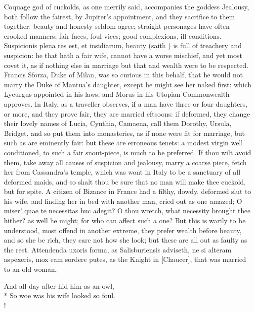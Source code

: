 Coquage god of cuckolds, as one merrily said, accompanies the
goddess Jealousy, both follow the fairest, by Jupiter's appointment,
and they sacrifice to them together: beauty and honesty seldom agree;
straight personages have often crooked manners; fair faces, foul vices;
good complexions, ill conditions. Suspicionis plena res est, et
insidiarum, beauty (saith \Chrysostom{}) is full of treachery and
suspicion: he that hath a fair wife, cannot have a worse mischief, and
yet most covet it, as if nothing else in marriage but that and wealth
were to be respected. Francis Sforza, Duke of Milan, was so
curious in this behalf, that he would not marry the Duke of Mantua's
daughter, except he might see her naked first: which Lycurgus appointed
in his laws, and Morus in his Utopian Commonwealth approves. In
Italy, as a traveller observes, if a man have three or four daughters,
or more, and they prove fair, they are married eftsoons: if deformed,
they change their lovely names of Lucia, Cynthia, Camaena, call them
Dorothy, Ursula, Bridget, and so put them into monasteries, as if none
were fit for marriage, but such as are eminently fair: but these are
erroneous tenets: a modest virgin well conditioned, to such a fair
snout-piece, is much to be preferred. If thou wilt avoid them, take
away all causes of suspicion and jealousy, marry a coarse piece, fetch
her from Cassandra's temple, which was wont in Italy to be a
sanctuary of all deformed maids, and so shalt thou be sure that no man
will make thee cuckold, but for spite. A citizen of Bizance in France
had a filthy, dowdy, deformed slut to his wife, and finding her in bed
with another man, cried out as one amazed; O miser! quae te necessitas
huc adegit? O thou wretch, what necessity brought thee hither? as well
he might; for who can affect such a one? But this is warily to be
understood, most offend in another extreme, they prefer wealth before
beauty, and so she be rich, they care not how she look; but these are
all out as faulty as the rest. Attendenda uxoris forma, as
Salisburiensis adviseth, ne si alteram aspexeris, mox eam sordere
putes, as the Knight in [Chaucer], that was married to an old woman,\label{mention:chaucer-quote-postface}
%
{\gothfont%
\begin{versewithlinenos}{2}{1}{1}%
And all day after hid him as an owl,\\*
So woe was his wife looked so foul.\\!
\end{versewithlinenos}%
}%

